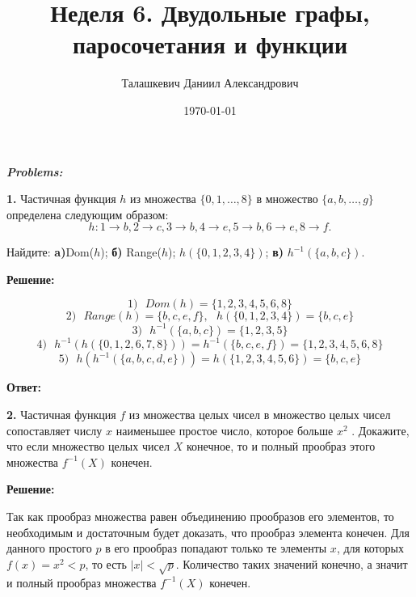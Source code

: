 \documentclass[a4paper,12pt]{article} %
\author{Талашкевич Даниил Александрович}
\title{Неделя 6. Двудольные графы, паросочетания
и функции}
\date{\today}
\begin{document}
\maketitle
\thispagestyle{empty}

\newpage
\setcounter{page}{1}
\begin{center}
\itshape
\bfseries
{ \Large Problems:}
\end{center}

{\bf 1.} Частичная функция $h$ из множества $\{0, 1, \dots , 8\}$ в множество $\{a, b, \dots, g\}$
определена следующим образом:
\[ h : 1\rightarrow b,2 \rightarrow c, 3 \rightarrow b, 4\rightarrow e, 5 \rightarrow b, 6\rightarrow e, 8 \rightarrow f. \]

Найдите: {\bf a)}Dom($h$); {\bf б)} Range($h$); $h(\{ 0,1,2,3,4\})$; {\bf в)} $h^{-1}(\{ a,b,c\})$.
\begin{center}
\bfseries
{\Large Решение: }
\end{center}

\[1) \text{ } Dom(h) = \lbrace 1, 2, 3, 4, 5, 6, 8 \rbrace\]
\[2) \text{ } Range(h) = \lbrace b, c, e, f\rbrace, \text{ } h(\lbrace 0,1,2,3,4\rbrace) = \lbrace b, c, e \rbrace \]
\[3) \text{ } h^{-1}(\lbrace a,b,c\rbrace) = \lbrace 1,2,3,5 \rbrace\]
\[4) \text{ } h^{-1}(h(\lbrace 0,1,2,6,7,8\rbrace)) = h^{-1}(\lbrace b,c,e,f \rbrace) = \lbrace 1,2,3,4,5,6,8 \rbrace\]
\[5) \text{ } h(h^{-1}(\lbrace a,b,c,d,e\rbrace)) = h(\lbrace 1,2,3,4, 5,6\rbrace) = \lbrace b, c, e \rbrace\]


\begin{flushright}
\begin{large}
\textbf {Ответ: }
\end{large}
\end{flushright}

{\bf 2.} Частичная функция $f$ из множества целых чисел в множество целых
чисел сопоставляет числу $x$ наименьшее простое число, которое больше $x^2$
. Докажите, что если множество целых чисел $X$ конечное, то и
полный прообраз этого множества $f^{-1}(X)$ конечен.
\begin{center}
\bfseries
{\Large Решение: }
\end{center}



Так как прообраз множества равен объединению прообразов его элементов, то необходимым и достаточным будет доказать, что прообраз элемента конечен. Для данного простого $p$ в его прообраз попадают только те элементы $x$, для которых $f(x)=x^2 < p$, то есть $|x| < \sqrt{p}$. Количество таких значений конечно, а значит и полный прообраз множества $f^{-1}(X)$ конечен.
\end{document}
